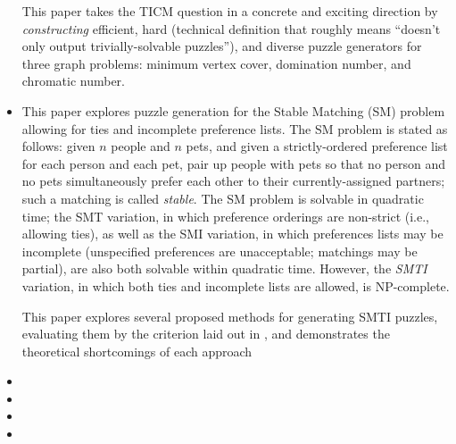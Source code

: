 \documentclass{extarticle}
\begin{document}
\begin{itemize}
\begin{annotation}
      This paper takes the TICM question in a concrete and exciting direction
      by \emph{constructing} efficient, hard (technical definition that roughly
      means ``doesn't only output trivially-solvable puzzles''), and diverse
      puzzle generators for three graph problems: minimum vertex cover,
      domination number, and chromatic number.
    \end{annotation}

  \item {}

    \begin{annotation}
      This paper explores puzzle generation for the Stable Matching (SM)
      problem allowing for ties and incomplete preference lists.  The SM
      problem is stated as follows: given \(n\) people and \(n\) pets, and
      given a strictly-ordered preference list for each person and each pet,
      pair up people with pets so that no person and no pets simultaneously
      prefer each other to their currently-assigned partners; such a matching
      is called \emph{stable}.  The SM problem is solvable in quadratic time;
      the SMT variation, in which preference orderings are non-strict (i.e.,
      allowing ties), as well as the SMI variation, in which preferences lists
      may be incomplete (unspecified preferences are unacceptable; matchings
      may be partial), are also both solvable within quadratic time.  However,
      the \emph{SMTI} variation, in which both ties and incomplete lists are
      allowed, is NP-complete.

      This paper explores several proposed methods for generating SMTI puzzles,
      evaluating them by the criterion laid out in
      \textcite{test-gen-complexity}, and demonstrates the theoretical
      shortcomings of each approach
    \end{annotation}

  \item {}

  \item {}

  \item {}

  \item {}

\end{itemize}
\end{document}
